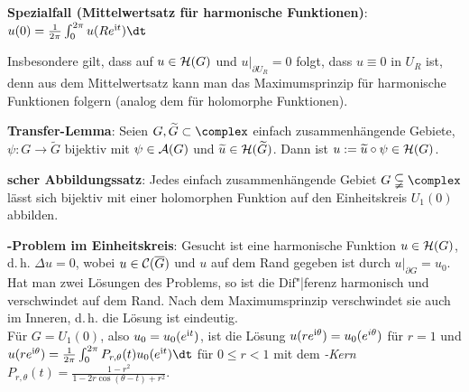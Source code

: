 \textbf{Spezialfall (Mittelwertsatz für harmonische Funktionen)}:
$u(0) = \frac{1}{2\pi} \int_0^{2\pi} u(R e^{\i t}) \dt$

Insbesondere gilt, dass auf $u \in \mathcal{H}(G)$ und $u|_{\partial U_R} = 0$ folgt,
dass $u \equiv 0$ in $U_R$ ist, denn aus dem Mittelwertsatz kann
man das Maximumsprinzip für harmonische Funktionen folgern
(analog dem für holomorphe Funktionen).

\linie

\textbf{Transfer-Lemma}:
Seien $G, \widetilde{G} \subset \complex$ einfach zusammenhängende
Gebiete, $\psi\colon G \rightarrow \widetilde{G}$ bijektiv mit $\psi \in \mathcal{A}(G)$
und $\widetilde{u} \in \mathcal{H}(\widetilde{G})$.
Dann ist $u := \widetilde{u} \circ \psi \in \mathcal{H}(G)$.

\textbf{scher Abbildungssatz}:
Jedes einfach zusammenhängende Gebiet $G \subsetneqq \complex$ lässt sich
bijektiv mit einer holomorphen Funktion auf den Einheitskreis $U_1(0)$
abbilden.

\textbf{-Problem im Einheitskreis}:
Gesucht ist eine harmonische Funktion $u \in \mathcal{H}(G)$,
d.\,h. $\Delta u = 0$, wobei $u \in \mathcal{C}(\overline{G})$ und
$u$ auf dem Rand gegeben ist durch $u|_{\partial G} = u_0$.\\
Hat man zwei Lösungen des Problems, so ist die Dif"|ferenz harmonisch und
verschwindet auf dem Rand.
Nach dem Maximumsprinzip verschwindet sie auch im Inneren, d.\,h. die Lösung
ist eindeutig.\\
Für $G = U_1(0)$, also $u_0 = u_0(e^{\mathrm{i} t})$, ist die Lösung
$u(r e^{\mathrm{i} \theta}) = u_0(e^{i \theta})$ für $r = 1$ und\\
$u(r e^{\i \theta}) = \frac{1}{2\pi}
\int_0^{2\pi} P_{r,\theta}(t) u_0(e^{\i t}) \dt$ für $0 \le r < 1$ mit
dem \emph{-Kern}
$P_{r,\theta}(t) = \frac{1 - r^2}{1 - 2r\cos(\theta - t) + r^2}$.

\pagebreak
